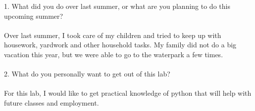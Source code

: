 \documentclass[12pt]{article}
\begin{document}
1. What did you do over last summer, or what are you planning to do this upcoming summer?

\paragraph{}
Over last summer, I took care of my children and tried to keep up with housework, yardwork and other household tasks.  My family did not do a big vacation this year, but we were able to go to the waterpark a few times.

\paragraph{}
2. What do you personally want to get out of this lab?

\paragraph{}
For this lab, I would like to get practical knowledge of python that will help with future classes and employment.
\end{document}

